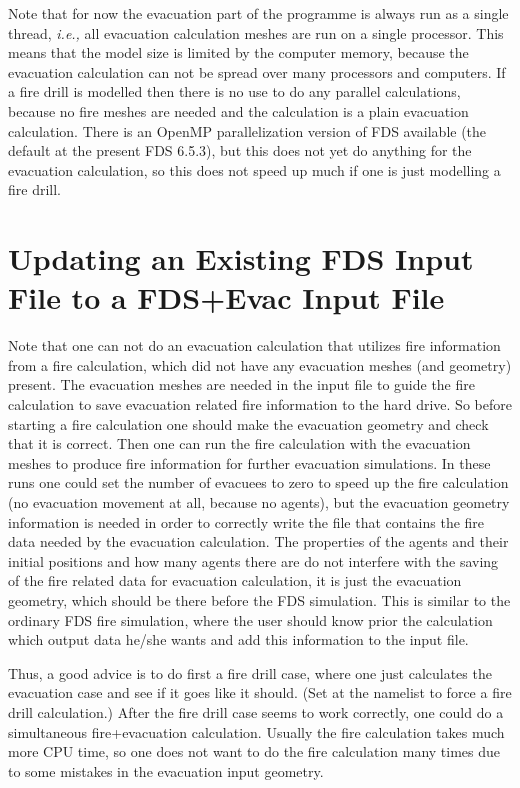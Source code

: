 \documentclass[12pt,a4paper,final,twoside]{stylevk}
\begin{document}
Note that for now the evacuation part of the programme is always run
as a single thread, \emph{i.e.,} all evacuation calculation meshes are
run on a single processor.  This means that the model size is limited
by the computer memory, because the evacuation calculation can not be
spread over many processors and computers.  If a fire drill is
modelled then there is no use to do any parallel calculations, because
no fire meshes are needed and the calculation is a plain evacuation
calculation.  There is an OpenMP parallelization version of FDS
available (the default at the present FDS 6.5.3), but this does not
yet do anything for the evacuation calculation, so this does not speed
up much if one is just modelling a fire drill.


\section{Updating an Existing FDS Input File to a FDS+Evac Input
  File}\label{Sec_UpdatingInput} 

Note that one can not do an evacuation calculation that utilizes fire
information from a fire calculation, which did not have any evacuation
meshes (and geometry) present.  The evacuation meshes are needed in
the input file to guide the fire calculation to save evacuation
related fire information to the hard drive.  So before starting a fire
calculation one should make the evacuation geometry and check that it
is correct.  Then one can run the fire calculation with the evacuation
meshes to produce fire information for further evacuation simulations.
In these runs one could set the number of evacuees to zero to speed up
the fire calculation (no evacuation movement at all, because no
agents), but the evacuation geometry information is needed in order to
correctly write the  file that contains the fire
data needed by the evacuation calculation.  The properties of the
agents and their initial positions and how many agents there are do
not interfere with the saving of the fire related data for evacuation
calculation, it is just the evacuation geometry, which should be there
before the FDS simulation.  This is similar to the ordinary FDS fire
simulation, where the user should know prior the calculation which
output data he/she wants and add this information to the input file.


Thus, a good advice is to do first a fire drill case, where one just
calculates the evacuation case and see if it goes like it should.
(Set at the  namelist  to
force a fire drill calculation.) After the fire drill case seems to
work correctly, one could do a simultaneous fire+evacuation
calculation.  Usually the fire calculation takes much more CPU time,
so one does not want to do the fire calculation many times due to some
mistakes in the evacuation input geometry.
\end{document}
